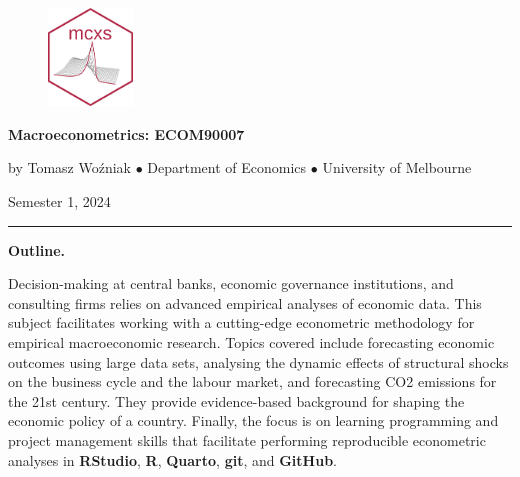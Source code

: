 \documentclass[10pt]{article}
\begin{document}

\begin{figure}
	\centering
    	\includegraphics[width=0.2\textwidth]{mcxs.png}
\end{figure}


\bigskip\noindent\textbf{\LARGE Macroeconometrics: ECOM90007}

\smallskip\noindent by Tomasz Wo\'zniak $\bullet$ Department of Economics $\bullet$  University of Melbourne

\smallskip\noindent Semester 1, 2024

\smallskip\noindent\rule{5cm}{.1pt}

\normalsize
\smallskip\noindent\textbf{Outline.} 

\noindent Decision-making at central banks, economic governance institutions, and consulting firms relies on advanced empirical analyses of economic data. This subject facilitates working with a cutting-edge econometric methodology for empirical macroeconomic research. Topics covered include forecasting economic outcomes using large data sets, analysing the dynamic effects of structural shocks on the business cycle and the labour market, and forecasting CO2 emissions for the 21st century. They provide evidence-based background for shaping the economic policy of a country. Finally, the focus is on learning programming and project management skills that facilitate performing reproducible econometric analyses in \textbf{RStudio}, \textbf{R}, \textbf{Quarto}, \textbf{git}, and \textbf{GitHub}.
\end{document}
